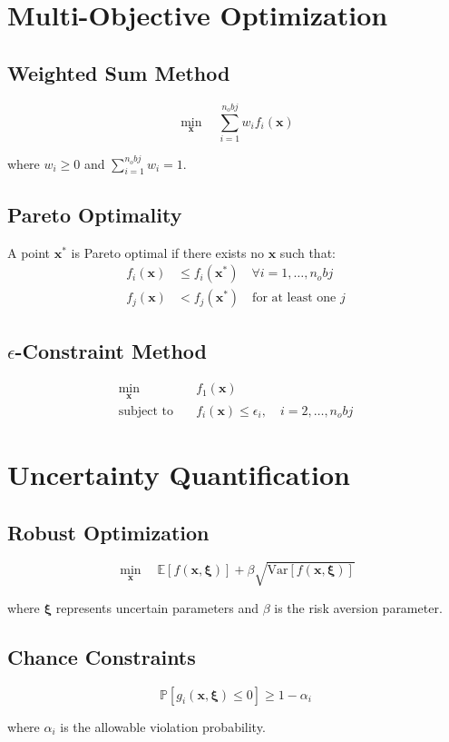 \documentclass{article}
\begin{document}
\section{Multi-Objective Optimization}

\subsection{Weighted Sum Method}
\begin{equation}
\min_{\mathbf{x}} \quad \sum_{i=1}^{n_obj} w_i f_i(\mathbf{x})
\end{equation}

where $w_i \geq 0$ and $\sum_{i=1}^{n_obj} w_i = 1$.

\subsection{Pareto Optimality}
A point $\mathbf{x}^*$ is Pareto optimal if there exists no $\mathbf{x}$ such that:
\begin{align}
f_i(\mathbf{x}) &\leq f_i(\mathbf{x}^*) \quad \forall i = 1, \ldots, n_obj \\
f_j(\mathbf{x}) &< f_j(\mathbf{x}^*) \quad \text{for at least one } j
\end{align}

\subsection{$\epsilon$-Constraint Method}
\begin{align}
\min_{\mathbf{x}} \quad &f_1(\mathbf{x}) \\
\text{subject to} \quad &f_i(\mathbf{x}) \leq \epsilon_i, \quad i = 2, \ldots, n_obj
\end{align}

\section{Uncertainty Quantification}

\subsection{Robust Optimization}
\begin{equation}
\min_{\mathbf{x}} \quad \mathbb{E}[f(\mathbf{x}, \boldsymbol{\xi})] + \beta \sqrt{\text{Var}[f(\mathbf{x}, \boldsymbol{\xi})]}
\end{equation}

where $\boldsymbol{\xi}$ represents uncertain parameters and $\beta$ is the risk aversion parameter.

\subsection{Chance Constraints}
\begin{equation}
\mathbb{P}[g_i(\mathbf{x}, \boldsymbol{\xi}) \leq 0] \geq 1 - \alpha_i
\end{equation}

where $\alpha_i$ is the allowable violation probability.
\end{document}
